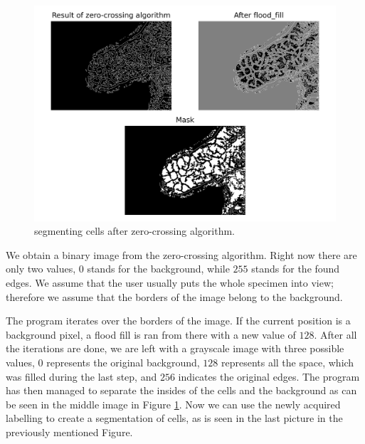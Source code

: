 \documentclass[
  digital,     %
  oneside,     %
  nosansbold,  %
  nocolorbold, %
  lof,         %
  lot,         %
]{fithesis4}
\begin{document}
\begin{figure}
    \begin{center}
        \includegraphics[width=\linewidth]{resources/flood_fill.png}
    \end{center}
    \caption{segmenting cells after zero-crossing algorithm.}
    \label{fig:flood_fill}
\end{figure}

We obtain a binary image from the zero-crossing algorithm. Right now there are
only two values, $0$ stands for the background, while $255$ stands for the found
edges. We assume that the user usually puts the whole specimen into view;
therefore we assume that the borders of the image belong to the background.

The program iterates over the borders of the image. If the current position is
a background pixel, a flood fill is ran from there with a new value of $128$.
After all the iterations are done, we are left with a grayscale
image with three possible values, $0$ represents the original background, $128$
represents all the space, which was filled during the last step, and $256$
indicates the original edges. The program has then managed to separate the insides of
the cells and the background as can be seen in the middle image in Figure
\ref{fig:flood_fill}. Now we can use the newly acquired labelling to create a
segmentation of cells, as is seen in the last picture in the previously mentioned
Figure.
\end{document}
